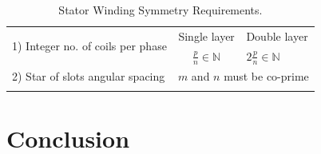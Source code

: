 \documentclass[journal]{IEEEtran}
\begin{document}
\begin{table}[t]
    \begin{minipage}{\columnwidth}
        \renewcommand{\arraystretch}{1.4} %
        \caption{Stator Winding Symmetry Requirements.}
        \label{tab:SymmetryRequirements}
        \centering
        \begin{tabular}{llc}\hline\hline
            \multirow{2}{*}{1) Integer no. of coils per phase} & \multicolumn{1}{|c}{Single layer} & \multicolumn{1}{|l}{Double layer} \\
          & \multicolumn{1}{|c}{$\frac{p}{n} \in\mathbb{N}$} & \multicolumn{1}{|l}{$2\frac{p}{n} \in \mathbb{N}$} \\
         \hline
            2) Star of slots angular spacing  & \multicolumn{2}{|l}{$m$ and $n$ must be co-prime} \\
       \hline
       \vspace{-3.5ex}
       \\
        \end{tabular}
    \end{minipage}
\end{table}

\section{Conclusion}
\end{document}
